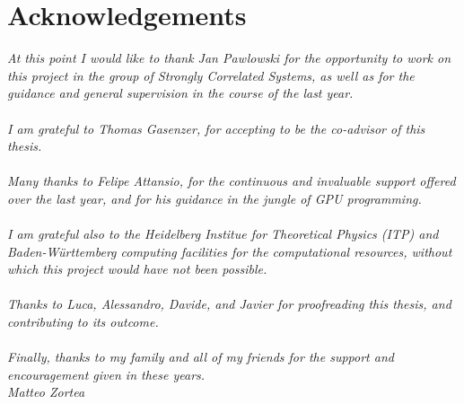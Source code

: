 \documentclass[
11pt, %
english, %
singlespacing, %
headsepline, %
]{MastersDoctoralThesis} %
\begin{document}









\chapter*{Acknowledgements}
\thispagestyle{empty}
\vspace*{0.2\textheight}
\noindent\textit{At this point I would like to thank Jan Pawlowski for the opportunity to work on this project in the group of Strongly Correlated Systems, as well as for the guidance and general supervision in the course of the last year. \\~\\ 
I am grateful to Thomas Gasenzer, for accepting to be the co-advisor of this thesis. \\~\\ 
Many thanks to Felipe Attansio, for the continuous and invaluable support offered over the last year, and for his guidance in the jungle of GPU programming. \\~\\
I am grateful also to the Heidelberg Institue for Theoretical Physics (ITP) and Baden-W\"urttemberg computing facilities for the computational resources, without which this project would have not been possible. \\~\\
Thanks to Luca, Alessandro, Davide, and Javier for proofreading this thesis, and contributing to its outcome. \\~\\ 
Finally, thanks to my family and all of my friends for the support and encouragement given in these years. \\[3cm]
\vspace{50pt}
\hfill Matteo Zortea}

\pagestyle{thesis} %

\appendix %

\end{document}
